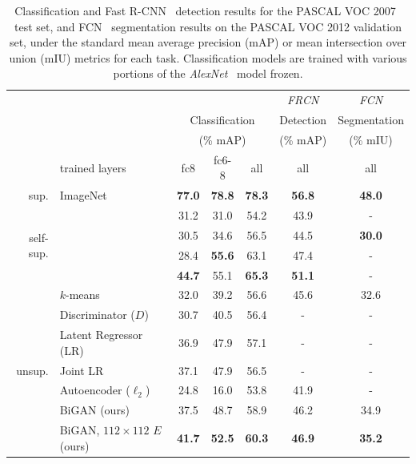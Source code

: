 \begin{table}
\small
\centering
\begin{tabular}{rlccccc}
\toprule
& & \multicolumn{3}{c}{} & \textit{FRCN} & \textit{FCN} \\
& & \multicolumn{3}{c}{Classification} & Detection & Segmentation \\
& & \multicolumn{3}{c}{(\% mAP)} & (\% mAP) & (\% mIU) \\

& trained layers & fc8 & fc6-8 & all & all & all \\
\midrule
\multirow{1}{*}{ sup. }
& ImageNet \citep{supervision}       & \bf{77.0} & \bf{78.8} & \bf{78.3} & \bf{56.8} & \bf{48.0} \\
\midrule
\multirow{4}{*}{ self-sup. }
& \citet{pulkit}                     & 31.2 & 31.0 & 54.2 & 43.9 &  -   \\
& \citet{deepak}                     & 30.5 & 34.6 & 56.5 & 44.5 & \bf{30.0} \\
& \citet{xiaolong}                   & 28.4 & \bf{55.6} & 63.1 & 47.4 &  -   \\
& \citet{carl}                       & \bf{44.7} & 55.1 & \bf{65.3} & \bf{51.1} &  -   \\
\midrule
\multirow{7}{*}{ unsup. }
& $k$-means \citep{datadep}          & 32.0 & 39.2 & 56.6 & 45.6 & 32.6 \\
& Discriminator ($D$)                & 30.7 & 40.5 & 56.4 &  -   & - \\
& Latent Regressor (LR)              & 36.9 & 47.9 & 57.1 &  -   & - \\
& Joint LR                           & 37.1 & 47.9 & 56.5 &  -   & - \\
& Autoencoder ($\ell_2$)             & 24.8 & 16.0 & 53.8 & 41.9 & - \\
& BiGAN (ours)                       & 37.5 & 48.7 & 58.9 & 46.2 & 34.9 \\
& BiGAN, $112\times112$ $E$ (ours)  & \bf{41.7} & \bf{52.5} & \bf{60.3} & \bf{46.9} & \bf{35.2} \\
\bottomrule
\end{tabular}
\caption{
Classification and Fast R-CNN~\citep{fastrcnn} detection results for the PASCAL VOC 2007~\citep{pascal} test set, and FCN~\citep{fcn} segmentation results on the PASCAL VOC 2012 validation set,
under the standard mean average precision (mAP) or mean intersection over union (mIU) metrics for each task.
Classification models are trained with various portions of the \textit{AlexNet}~\citep{supervision} model frozen.
}
\end{table}
